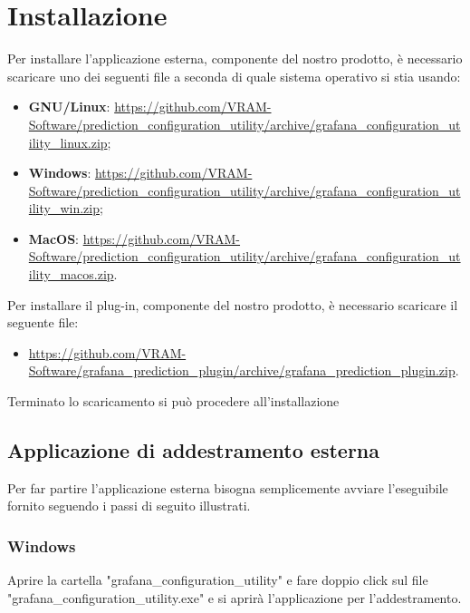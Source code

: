 \section{Installazione}
Per installare l'applicazione esterna, componente del nostro prodotto\glo, è necessario scaricare uno dei seguenti file a seconda di quale sistema operativo si stia usando:
\begin{itemize}
	\item \textbf{GNU/Linux}: \url{https://github.com/VRAM-Software/prediction_configuration_utility/archive/grafana_configuration_utility_linux.zip};
	\item \textbf{Windows}: \url{https://github.com/VRAM-Software/prediction_configuration_utility/archive/grafana_configuration_utility_win.zip};
	\item \textbf{MacOS}: \url{https://github.com/VRAM-Software/prediction_configuration_utility/archive/grafana_configuration_utility_macos.zip}.
\end{itemize}
Per installare il plug-in, componente del nostro prodotto\glo, è necessario scaricare il seguente file:
\begin{itemize}
	\item \url{https://github.com/VRAM-Software/grafana_prediction_plugin/archive/grafana_prediction_plugin.zip}.
\end{itemize}
Terminato lo scaricamento si può procedere all'installazione

\subsection{Applicazione di addestramento esterna}
Per far partire l'applicazione esterna bisogna semplicemente avviare l'eseguibile fornito seguendo i passi di seguito illustrati.
	\subsubsection{Windows}
	Aprire la cartella "grafana\_configuration\_utility" e fare doppio click sul file "grafana\_configuration\_utility.exe" e si aprirà l'applicazione per l'addestramento.


